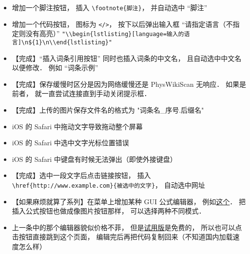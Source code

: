\begin{itemize}
\item 增加一个脚注按钮， 插入 \lstinline|\footnote{脚注}|， 并自动选中 “脚注”

\item 增加一个代码按钮， 图标为 \lstinline|</>|， 按下以后弹出输入框 “请指定语言（不指定则没有高亮）” \lstinline|"\\begin{lstlisting}[language=输入的语言]\n${1}\n\\end{lstlisting}"|

\item 【完成】“插入词条引用按钮” 同时也插入词条的中文名， 且自动选中中文名以便修改． 例如 “词条示例”

\item 【完成】保存缓慢时区分是因为网络缓慢还是 PhysWikiScan 无响应． 如果是前者， 就一直尝试连接直到手动关闭提示框．

\item 【完成】上传的图片保存文件名的格式为 "词条名_序号.后缀名"

\item iOS 的 Safari 中拖动文字导致拖动整个屏幕

\item iOS 的 Safari 中选中文字光标位置错误

\item iOS 的 Safari 中键盘有时候无法弹出（即使外接键盘）

\item 【完成】选中一段文字后点击链接按钮， 插入 \lstinline|\href{http://www.example.com}{被选中的文字}|， 自动选中网址

\item 【如果麻烦就算了系列】在菜单上增加某种 GUI 公式编辑器， 例如\href{http://latex.codecogs.com/eqneditor/editor.php}{这个}． 把插入公式按钮也做成像图片按钮那样， 可以选择两种不同模式．

\item 上一条中的那个编辑器貌似价格不菲， 但是\href{https://www.codecogs.com/latex/eqneditor.php?lang=zh-cn}{试用版}是免费的， 所以也可以点击按钮直接跳到这个页面， 编辑完后再把代码复制回来（不知道国内加载速度怎么样）


\end{itemize}
